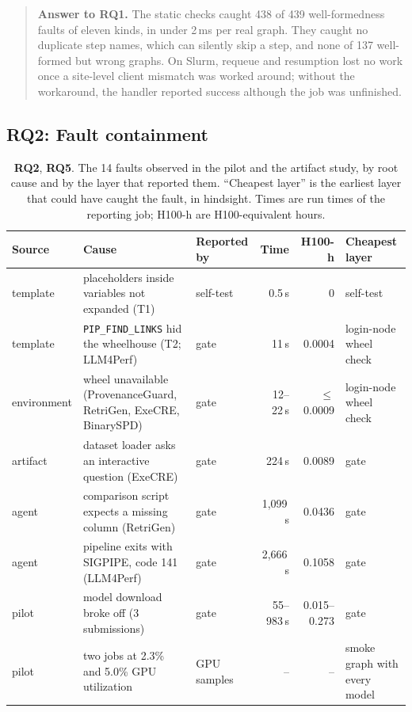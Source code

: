 \documentclass[pdflatex,sn-mathphys-num]{sn-jnl}
\theoremstyle{thmstyletwo}%
\theoremstyle{thmstylethree}%
\newcommand{\code}[1]{\texttt{#1}}
\newcommand{\RQ}[1]{\textbf{RQ#1}}
\begin{document}
\begin{quote}\small\textbf{Answer to \RQ{1}.} The static checks caught 438 of 439 well-formedness faults of eleven kinds, in under 2\,ms per real graph. They caught no duplicate step names, which can silently skip a step, and none of 137 well-formed but wrong graphs. On Slurm, requeue and resumption lost no work once a site-level client mismatch was worked around; without the workaround, the handler reported success although the job was unfinished.\end{quote}

\subsection{RQ2: Fault containment}\label{sec:rq2}

\begin{table}[t]
\centering\footnotesize
\caption{\RQ{2}, \RQ{5}. The 14 faults observed in the pilot and the artifact study, by root cause and by the layer that reported them. ``Cheapest layer'' is the earliest layer that could have caught the fault, in hindsight. Times are run times of the reporting job; H100-h are H100-equivalent hours.}\label{tab:faults}
\setlength{\tabcolsep}{3pt}
\begin{tabularx}{\textwidth}{@{}l >{\raggedright\arraybackslash}X l r r >{\raggedright\arraybackslash}p{2.1cm}@{}}
\toprule
Source & Cause & Reported by & Time & H100-h & Cheapest layer \\
\midrule
template & placeholders inside variables not expanded (T1) & self-test & 0.5\,s & 0 & self-test \\
template & \code{PIP\_FIND\_LINKS} hid the wheelhouse (T2; LLM4Perf) & gate & 11\,s & 0.0004 & login-node wheel check \\
environment & wheel unavailable (ProvenanceGuard, RetriGen, ExeCRE, BinarySPD) & gate & 12--22\,s & $\le$0.0009 & login-node wheel check \\
artifact & dataset loader asks an interactive question (ExeCRE) & gate & 224\,s & 0.0089 & gate \\
agent & comparison script expects a missing column (RetriGen) & gate & 1{,}099\,s & 0.0436 & gate \\
agent & pipeline exits with SIGPIPE, code 141 (LLM4Perf) & gate & 2{,}666\,s & 0.1058 & gate \\
pilot & model download broke off (3 submissions) & gate & 55--983\,s & 0.015--0.273 & gate \\
pilot & two jobs at 2.3\% and 5.0\% GPU utilization & GPU samples & -- & -- & smoke graph with every model \\
\bottomrule
\end{tabularx}
\end{table}
\end{document}
